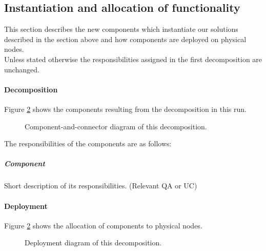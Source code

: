 \subsection{Instantiation and allocation of functionality}
    This section describes the new components which instantiate our solutions described
    in the section above and how components are deployed on physical nodes. \\
    Unless stated otherwise the responsibilities assigned in the first decomposition are unchanged.

    \paragraph{Decomposition}
        Figure \ref{fig:FIGURELABEL} shows the components resulting from the
        decomposition in this run.

        \begin{figure}[!h]
        	\centering
        	\caption{Component-and-connector diagram of this decomposition.}
            \label{fig:FIGURELABEL}
        \end{figure}

        The responsibilities of the components are as follows:

    \subparagraph{Component}
        Short description of its responsibilities. (Relevant QA or UC)




    \paragraph{Deployment}
        Figure \ref{fig:FIGURELABEL} shows the allocation of components
        to physical nodes.

        \begin{figure}[!h]
        	\centering
        	\caption{Deployment diagram of this decomposition.}
            \label{fig:FIGURELABEL}
        \end{figure}


